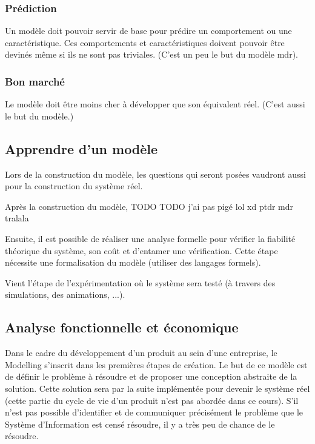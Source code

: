 \documentclass[../Syllabus.tex]{subfiles}
\begin{document}
\subsubsection{Prédiction}

Un modèle doit pouvoir servir de base pour prédire un comportement ou une caractéristique. Ces comportements et caractéristiques doivent pouvoir être devinés même si ils ne sont pas triviales. (C'est un peu le but du modèle mdr).

\subsubsection{Bon marché}

Le modèle doit être moins cher à développer que son équivalent réel. (C'est aussi le but du modèle.)

\subsection{Apprendre d'un modèle}

Lors de la construction du modèle, les questions qui seront posées vaudront aussi pour la construction du système réel.

Après la construction du modèle, TODO TODO j'ai pas pigé lol xd ptdr mdr tralala

Ensuite, il est possible de réaliser une analyse formelle pour vérifier la fiabilité théorique du système, son coût et d'entamer une vérification. Cette étape nécessite une formalisation du modèle (utiliser des langages formels).

Vient l'étape de l'expérimentation où le système sera testé (à travers des simulations, des animations, ...).

\subsection{Analyse fonctionnelle et économique}

Dans le cadre du développement d'un produit au sein d'une entreprise, le Modelling s'inscrit dans les premières étapes de création. Le but de ce modèle est de définir le problème à résoudre et de proposer une conception abstraite de la solution. Cette solution sera par la suite implémentée pour devenir le système réel (cette partie du cycle de vie d'un produit n'est pas abordée dans ce cours). S'il n'est pas possible d'identifier et de communiquer précisément le problème que le Système d'Information est censé résoudre, il y a très peu de chance de le résoudre.
\end{document}
